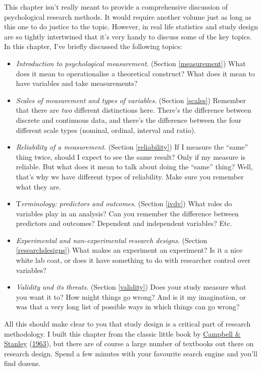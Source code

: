 \documentclass[
]{book}
\providecommand{\tightlist}{%
  \setlength{\itemsep}{0pt}\setlength{\parskip}{0pt}}
\begin{document}
This chapter isn't really meant to provide a comprehensive discussion of psychological research methods. It would require another volume just as long as this one to do justice to the topic. However, in real life statistics and study design are so tightly intertwined that it's very handy to discuss some of the key topics. In this chapter, I've briefly discussed the following topics:

\begin{itemize}
\tightlist
\item
  \emph{Introduction to psychological measurement}. (Section \ref{measurement}) What does it mean to operationalise a theoretical construct? What does it mean to have variables and take measurements?
\item
  \emph{Scales of measurement and types of variables}. (Section \ref{scales}) Remember that there are \emph{two} different distinctions here. There's the difference between discrete and continuous data, and there's the difference between the four different scale types (nominal, ordinal, interval and ratio).
\item
  \emph{Reliability of a measurement}. (Section \ref{reliability}) If I measure the ``same'' thing twice, should I expect to see the same result? Only if my measure is reliable. But what does it mean to talk about doing the ``same'' thing? Well, that's why we have different types of reliability. Make sure you remember what they are.
\item
  T\emph{erminology: predictors and outcomes}. (Section \ref{ivdv}) What roles do variables play in an analysis? Can you remember the difference between predictors and outcomes? Dependent and independent variables? Etc.
\item
  \emph{Experimental and non-experimental research designs}. (Section \ref{researchdesigns}) What makes an experiment an experiment? Is it a nice white lab coat, or does it have something to do with researcher control over variables?
\item
  \emph{Validity and its threats}. (Section \ref{validity}) Does your study measure what you want it to? How might things go wrong? And is it my imagination, or was that a very long list of possible ways in which things can go wrong?
\end{itemize}

All this should make clear to you that study design is a critical part of research methodology. I built this chapter from the classic little book by \protect\hyperlink{ref-Campbell1963}{Campbell \& Stanley} (\protect\hyperlink{ref-Campbell1963}{1963}), but there are of course a large number of textbooks out there on research design. Spend a few minutes with your favourite search engine and you'll find dozens.
\end{document}
